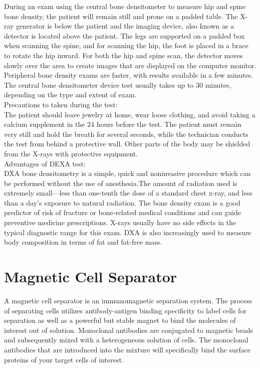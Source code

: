 \documentclass[12pt]{article}
\begin{document}
During an exam using the central bone densitometer to measure hip and spine bone density, the patient will remain still and prone on a padded table. The X-ray generator is below the patient and the imaging device, also known as a detector is located above the patient. The legs are supported on a padded box when scanning the spine, and for scanning the hip, the foot is placed in a brace to rotate the hip inward. For both the hip and spine scan, the detector moves slowly over the area to create images that are displayed on the computer monitor. Peripheral bone density exams are faster, with results available in a few minutes. The central bone densitometer device test usually takes up to 30 minutes, depending on the type and extent of exam.\\

Precautions to taken during the test:\\ 
The patient should leave jewelry at home, wear loose clothing, and avoid taking a calcium supplement in the 24 hours before the test. The patient must remain very still and hold the breath for several seconds, while the technician conducts the test from behind a protective wall. Other parts of the body may be shielded from the X-rays with protective equipment.\\

Advantages of DEXA test:\\
DXA bone densitometry is a simple, quick and noninvasive procedure which can be performed without the use of anesthesia.The amount of radiation used is extremely small—less than one-tenth the dose of a standard chest x-ray, and less than a day's exposure to natural radiation. The bone density exam is a good predictor of risk of fracture or bone-related medical conditions and can guide preventive medicine prescriptions. X-rays usually have no side effects in the typical diagnostic range for this exam. DXA is also increasingly used to measure body composition in terms of fat and fat-free mass.

\clearpage 

\section{Magnetic Cell Separator}

A magnetic cell separator is an immunomagnetic separation system. The process of separating cells utilizes antibody-antigen binding specificity to label cells for separation as well as a powerful but stable magnet to bind the molecules of interest out of solution. Monoclonal antibodies are conjugated to magnetic beads and subsequently mixed with a heterogeneous solution of cells. The monoclonal antibodies that are introduced into the mixture will specifically bind the surface proteins of your target cells of interest.\\
\end{document}
